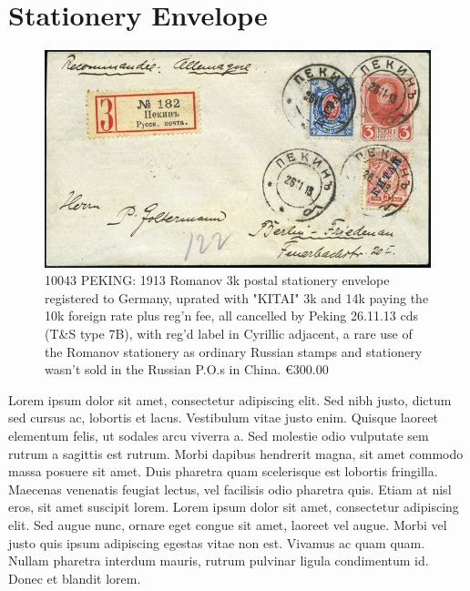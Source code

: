 \section{Stationery Envelope}

\begin{figure}[htbp]
\centering
\includegraphics[width=.95\textwidth]{../russian-post-offices-in-china/10043.jpg}
\caption{
10043 PEKING: 1913 Romanov 3k postal stationery envelope registered to 
Germany, uprated with "KITAI" 3k and 14k paying the 10k foreign rate 
plus reg'n fee, all cancelled by Peking 26.11.13 cds (T\&S type 7B), 
with reg'd label in Cyrillic adjacent, a rare use of the Romanov stationery 
as ordinary Russian stamps and stationery wasn't sold in the 
Russian P.O.s in China.
\euro 300.00 
}  
\end{figure}   

Lorem ipsum dolor sit amet, consectetur adipiscing elit. Sed nibh justo, dictum sed cursus ac, lobortis et lacus. Vestibulum vitae justo enim. Quisque laoreet elementum felis, ut sodales arcu viverra a. Sed molestie odio vulputate sem rutrum a sagittis est rutrum. Morbi dapibus hendrerit magna, sit amet commodo massa posuere sit amet. Duis pharetra quam scelerisque est lobortis fringilla. Maecenas venenatis feugiat lectus, vel facilisis odio pharetra quis. Etiam at nisl eros, sit amet suscipit lorem. Lorem ipsum dolor sit amet, consectetur adipiscing elit. Sed augue nunc, ornare eget congue sit amet, laoreet vel augue. Morbi vel justo quis ipsum adipiscing egestas vitae non est. Vivamus ac quam quam. Nullam pharetra
                                                    interdum mauris, rutrum pulvinar ligula condimentum id. Donec et blandit lorem. 

